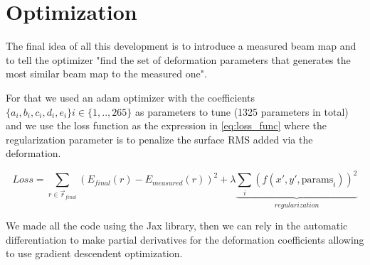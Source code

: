 \section{Optimization}
The final idea of all this development is to introduce a measured beam map and to tell the optimizer "find the set of deformation parameters that generates the most similar beam map to the measured one".


For that we used an adam optimizer with the coefficients $\{a_i, b_i, c_i, d_i, e_i\} i \in \{1,..,265\}$ as parameters to tune (1325 parameters in total) and we use the loss function as the expression in \ref{eq:loss_func} where the regularization parameter is to penalize the surface RMS added via the deformation.

\begin{equation}
    Loss = \sum_{r \in \vec{r}_{final}} (E_{final}(r)-E_{measured}(r))^2 + \lambda \underbrace{\sum_{i} (f(x',y', \text{params}_{i}))^2}_{regularization}
    \label{eq:loss_func}
\end{equation}

We made all the code using the Jax library, then we can rely in the automatic differentiation to make partial derivatives for the deformation coefficients allowing to use gradient descendent optimization.


